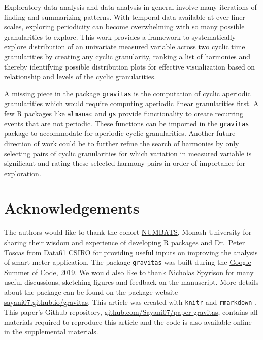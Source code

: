 \documentclass[12pt]{article}
\begin{document}
Exploratory data analysis and data analysis in general involve many iterations of finding and summarizing patterns. With temporal data available at ever finer scales, exploring periodicity can become overwhelming with so many possible granularities to explore. This work provides a framework to systematically explore distribution of an univariate measured variable across two cyclic time granularities by creating any cyclic granularity, ranking a list of harmonies and thereby identifying possible distribution plots for effective visualization based on relationship and levels of the cyclic granularities.

A missing piece in the package \texttt{gravitas} is the computation of cyclic aperiodic granularities which would require computing aperiodic linear granularities first. A few R packages like \texttt{almanac} and \texttt{gs} provide functionality to create recurring events that are not periodic. These functions can be imported in the \texttt{gravitas} package to accommodate for aperiodic cyclic granularities. Another future direction of work could be to further refine the search of harmonies by only selecting pairs of cyclic granularities for which variation in measured variable is significant and rating these selected harmony pairs in order of importance for exploration.

\hypertarget{acknowledgements}{%
\section*{Acknowledgements}\label{acknowledgements}}

The authors would like to thank the cohort \href{https://www.monash.edu/news/articles/team-profile-monash-business-analytics-team}{NUMBATS}, Monash University for sharing their wisdom and experience of developing R packages and Dr.~Peter Toscas \href{https://data61.csiro.au/}{from Data61 CSIRO} for providing useful inputs on improving the analysis of smart meter application. The package \texttt{gravitas} was built during the \href{https://summerofcode.withgoogle.com/archive/}{Google Summer of Code, 2019}. We would also like to thank Nicholas Spyrison for many useful discussions, sketching figures and feedback on the manuscript. More details about the package can be found on the package website \href{https://sayani07.github.io/gravitas/}{sayani07.github.io/gravitas}. This article was created with \texttt{knitr} \citep[\citet{R-knitr}]{knitr2015} and \texttt{rmarkdown} \citep[\citet{R-rmarkdown}]{rmarkdown2018}. This paper's Github repository, \href{https://github.com/Sayani07/paper-gravitas}{github.com/Sayani07/paper-gravitas}, contains all materials required to reproduce this article and the code is also available online in the supplemental materials.
\end{document}
